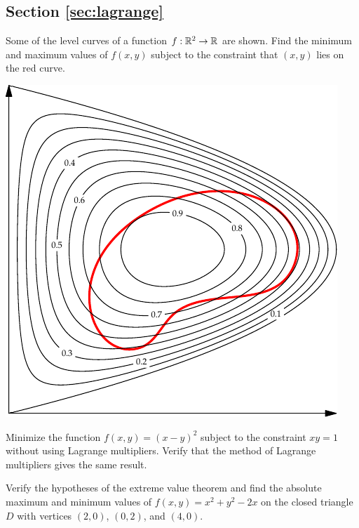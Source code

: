 \documentclass[svgnames]{watsonbook}
\begin{document}
\subsection*{Section \ref{sec:lagrange}}

\begin{exercise}{}{}
  Some of the level curves of a function $f: \mathbb{R}^2 \to \mathbb{R}$ are
  shown. Find the minimum and maximum values of $f(x,y)$ subject to
  the constraint that $(x,y)$ lies on the red curve.
  \begin{center}
    \includegraphics{exercisefigures/lagrange_exercise} 
  \end{center}
\end{exercise}

\begin{exercise}{}{}
  Minimize the function $f(x,y) = (x-y)^2$ subject to the constraint
  $xy = 1$ without using Lagrange multipliers. Verify that the method
  of Lagrange multipliers gives the same result.
\end{exercise}

\begin{exercise}{}{}
  Verify the hypotheses of the extreme value theorem and find the
  absolute maximum and minimum values of $f(x,y) = x^2+y^2-2x$ on the
  closed triangle $D$ with vertices $(2,0)$, $(0,2)$, and $(4,0)$.
\end{exercise}
\end{document}
